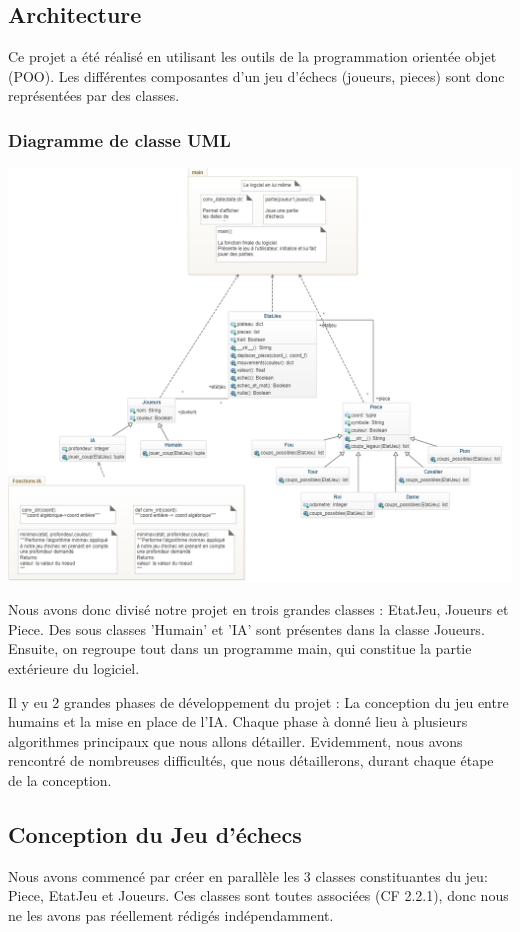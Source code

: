 \documentclass{article}
\begin{document}
\subsection{Architecture}
Ce projet a été réalisé en utilisant les outils de la programmation orientée objet (POO).
Les différentes composantes d'un jeu d'échecs (joueurs, pieces) sont donc 
représentées par des classes.
\subsubsection{Diagramme de classe UML}
\includegraphics[scale=0.6]{uml.png}

Nous avons donc divisé notre projet en trois grandes classes : EtatJeu, Joueurs et Piece.
Des sous classes 'Humain' et 'IA' sont présentes dans la classe Joueurs.
Ensuite, on regroupe tout dans un programme main, qui constitue la partie extérieure du logiciel.


Il y eu 2 grandes phases de développement du projet : La conception du jeu entre humains
et la mise en place de l'IA. Chaque phase à donné lieu à plusieurs algorithmes principaux que nous allons détailler.
Evidemment, nous avons rencontré de nombreuses difficultés, que nous détaillerons, durant chaque étape de la conception.

\subsection{Conception du Jeu d'échecs}
Nous avons commencé par créer en parallèle les 3 classes constituantes du jeu:
Piece, EtatJeu et Joueurs. Ces classes sont toutes associées (CF 2.2.1), donc
nous ne les avons pas réellement rédigés indépendamment.
\end{document}
